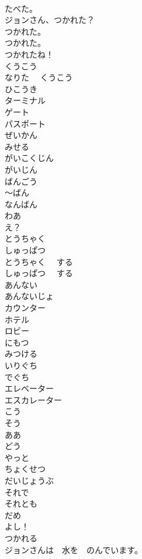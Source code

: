 \documentclass[8pt]{extreport}
\begin{document}
\begin{CJK}{UTF8}{min}
\\	たべた。	
\\	ジョンさん、つかれた？	
\\	つかれた。	
\\	つかれた。	
\\	つかれたね！	
\\	くうこう	
\\	なりた　 くうこう	
\\	ひこうき	
\\	ターミナル	
\\	ゲート	
\\	パスポート	
\\	ぜいかん	
\\	みせる	
\\	がいこくじん	
\\	がいじん	
\\	ばんごう	
\\	～ばん	
\\	なんばん	
\\	わあ	
\\	え？	
\\	とうちゃく	
\\	しゅっぱつ	
\\	とうちゃく　 する	
\\	しゅっぱつ　 する	
\\	あんない	
\\	あんないじょ	
\\	カウンター	
\\	ホテル	
\\	ロビー	
\\	にもつ	
\\	みつける	
\\	いりぐち	
\\	でぐち	
\\	エレベーター	
\\	エスカレーター	
\\	こう	
\\	そう	
\\	ああ	
\\	どう	
\\	やっと	
\\	ちょくせつ	
\\	だいじょうぶ	
\\	それで	
\\	それとも	
\\	だめ	
\\	よし！	
\\	つかれる	
\\	ジョンさんは　水を　のんでいます。	

\end{CJK}
\end{document}
